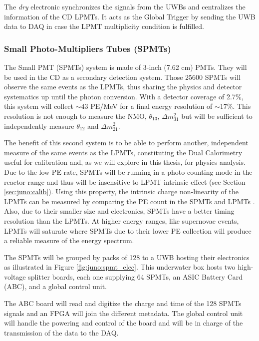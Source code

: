 \documentclass[../main.tex]{subfiles}
\begin{document}
The \textit{dry} electronic synchronizes the signals from the UWBs and centralizes the information of the CD LPMTs. It acts as the Global Trigger by sending the UWB data to DAQ in case the LPMT multiplicity condition is fulfilled.


\subsubsection{Small Photo-Multipliers Tubes (SPMTs)}
\label{sec:juno:SPMT}

The Small PMT (SPMTs) system is made of 3-inch (7.62 cm) PMTs. They will be used in the CD as a secondary detection system. Those 25600 SPMTs will observe the same events as the LPMTs, thus sharing the physics and detector systematics up until the photon conversion. With a detector coverage of 2.7\%, this system will collect $\sim 43$ PE/MeV for a final energy resolution of $\sim 17\%$. This resolution is not enough to measure the NMO, $\theta_{13}$, $\Delta m^2_{31}$ but will be sufficient to independently measure $\theta_{12}$ and $\Delta m^2_{21}$.

The benefit of this second system is to be able to perform another, independent measure of the same events as the LPMTs, constituting the Dual Calorimetry useful for calibration and, as we will explore in this thesis, for physics analysis.
Due to the low PE rate, SPMTs will be running in a photo-counting mode in the reactor range and thus will be insensitive to LPMT intrinsic effect (see Section \ref{sec:juno:calib}). Using this property, the intrinsic charge non-linearity of the LPMTs can be measured by comparing the PE count in the SPMTs and LPMTs \cite{han_dual_2021}. Also, due to their smaller size and electronics, SPMTs have a better timing resolution than the LPMTs.
At higher energy ranges, like supernovae events, LPMTs will saturate where SPMTs due to their lower PE collection will produce a reliable measure of the energy spectrum.

The SPMTs will be grouped by packs of 128 to a UWB hosting their electronics as illustrated in Figure \ref{fig:juno:spmt_elec}. This underwater box hosts two high-voltage splitter boards, each one supplying 64 SPMTs, an ASIC Battery Card (ABC), and a global control unit.

The ABC board will read and digitize the charge and time of the 128 SPMTs signals and an FPGA will join the different metadata. The global control unit will handle the powering and control of the board and will be in charge of the transmission of the data to the DAQ.
\end{document}
